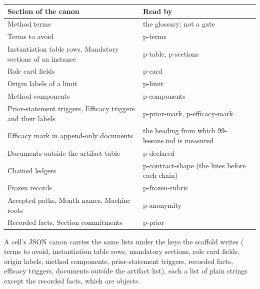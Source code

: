 \documentclass[
  american,
  10pt,
]{report}
\newcounter{none} %
\renewcommand{\texttt}[1]{{\ttfamily\hyphenchar\font=-1 #1}}
\begin{document}
{\def\LTcaptype{none} %
\begin{longtable}[]{@{}
  >{\raggedright\arraybackslash}p{}
  >{\raggedright\arraybackslash}p{}@{}}
\toprule\noalign{}
\begin{minipage}[b]{\linewidth}\raggedright
Section of the canon
\end{minipage} & \begin{minipage}[b]{\linewidth}\raggedright
Read by
\end{minipage} \\
\midrule\noalign{}
\endhead
\bottomrule\noalign{}
\endlastfoot
Method terms & the glossary; not a gate \\
Terms to avoid & \texttt{p-\allowbreak{}terms} \\
Instantiation table rows, Mandatory sections of an instance &
\texttt{p-\allowbreak{}table}, \texttt{p-\allowbreak{}sections} \\
Role card fields & \texttt{p-\allowbreak{}card} \\
Origin labels of a limit & \texttt{p-\allowbreak{}limit} \\
Method components & \texttt{p-\allowbreak{}components} \\
Prior-statement triggers, Efficacy triggers and their labels &
\texttt{p-\allowbreak{}prior-\allowbreak{}mark},
\texttt{p-\allowbreak{}efficacy-\allowbreak{}mark} \\
Efficacy mark in append-only documents & the heading from which
\texttt{99-\allowbreak{}lessons.\allowbreak{}md} is measured \\
Documents outside the artifact table &
\texttt{p-\allowbreak{}declared} \\
Chained ledgers & \texttt{p-\allowbreak{}contract-\allowbreak{}shape}
(the lines before each chain) \\
Frozen records & \texttt{p-\allowbreak{}frozen-\allowbreak{}rubric} \\
Accepted paths, Month names, Machine roots &
\texttt{p-\allowbreak{}anonymity} \\
Recorded facts, Section commitments & \texttt{p-\allowbreak{}prior} \\
\end{longtable}
}

A cell's JSON canon carries the same lists under the keys the scaffold
writes (\texttt{terms to avoid}, \texttt{instantiation table rows},
\texttt{mandatory sections}, \texttt{role card fields},
\texttt{origin labels}, \texttt{method components},
\texttt{prior-\allowbreak{}statement triggers}, \texttt{recorded facts},
\texttt{efficacy triggers},
\texttt{documents outside the artifact list}), each a list of plain
strings except the recorded facts, which are objects.
\end{document}
